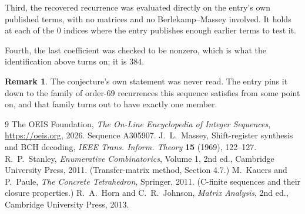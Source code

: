 \documentclass[11pt,a4paper]{article}
\theoremstyle{plain}
\theoremstyle{definition}
\newtheorem{remark}[theorem]{Remark}
\begin{document}
Third, the recovered recurrence was evaluated directly on the entry's own published terms, with
no matrices and no Berlekamp--Massey involved. It holds at each of the $0$ indices where
the entry publishes enough earlier terms to test it.

Fourth, the last coefficient was checked to be nonzero, which is what the identification above
turns on; it is $384$.

\begin{remark}
The conjecture's own statement was never read. The entry pins it down to the family of
order-$69$ recurrences this sequence satisfies from some point on, and that family turns
out to have exactly one member.
\end{remark}

\begin{thebibliography}{9}
 The OEIS Foundation, \emph{The On-Line Encyclopedia of Integer
Sequences}, \url{https://oeis.org}, 2026. Sequence A305907.
 J.~L.~Massey, Shift-register synthesis and BCH decoding, \emph{IEEE
Trans. Inform. Theory} \textbf{15} (1969), 122--127.
 R.~P.~Stanley, \emph{Enumerative Combinatorics}, Volume 1, 2nd ed.,
Cambridge University Press, 2011. (Transfer-matrix method, Section 4.7.)
 M.~Kauers and P.~Paule, \emph{The Concrete Tetrahedron}, Springer, 2011.
(C-finite sequences and their closure properties.)
 R.~A.~Horn and C.~R.~Johnson, \emph{Matrix Analysis}, 2nd ed., Cambridge
University Press, 2013.
\end{thebibliography}
\end{document}

